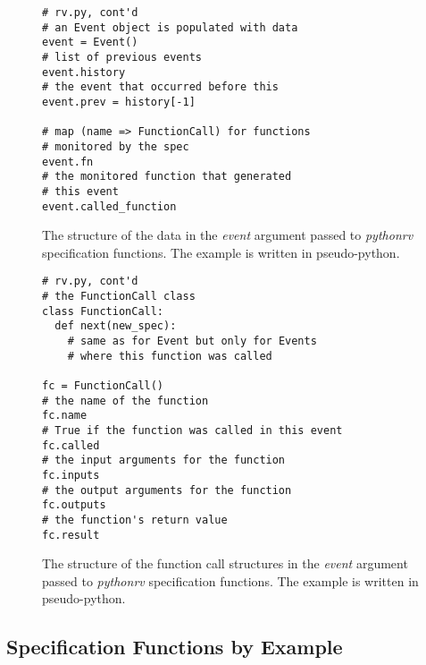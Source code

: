 \documentclass[a4paper,11pt]{kth-mag}
\theoremstyle{definition}
\begin{document}
\begin{figure}[h!]
	\begin{center}
	\begin{minipage}{0.7\textwidth}
	\begin{lstlisting}
# rv.py, cont'd
# an Event object is populated with data
event = Event()
# list of previous events
event.history
# the event that occurred before this
event.prev = history[-1]

# map (name => FunctionCall) for functions
# monitored by the spec
event.fn
# the monitored function that generated
# this event
event.called_function
	\end{lstlisting}
	\end{minipage}
	\end{center}

  \caption{The structure of the data in the \textit{event} argument passed to
    \textit{pythonrv} specification functions. The example is written in
    pseudo-python.}
	\label{figure-event-data}
\end{figure}

\begin{figure}[h!]
	\begin{center}
	\begin{minipage}{0.7\textwidth}
	\begin{lstlisting}
# rv.py, cont'd
# the FunctionCall class
class FunctionCall:
  def next(new_spec):
    # same as for Event but only for Events
    # where this function was called

fc = FunctionCall()
# the name of the function
fc.name
# True if the function was called in this event
fc.called
# the input arguments for the function
fc.inputs
# the output arguments for the function
fc.outputs
# the function's return value
fc.result
	\end{lstlisting}
	\end{minipage}
	\end{center}

  \caption{The structure of the function call structures in the \textit{event}
    argument passed to \textit{pythonrv} specification functions. The example
    is written in pseudo-python.}
	\label{figure-event-function-call}
\end{figure}



\clearpage
\subsection{Specification Functions by Example}
\lstset{language=Python,numbers=left}
\end{document}

